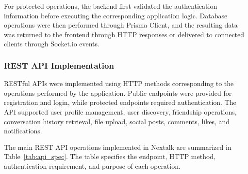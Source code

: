 \documentclass[12pt, a4paper]{article}
\begin{document}
For protected operations, the backend first validated the authentication information before executing the corresponding application logic. Database operations were then performed through Prisma Client, and the resulting data was returned to the frontend through HTTP responses or delivered to connected clients through Socket.io events.

\subsubsection{REST API Implementation}

RESTful APIs were implemented using HTTP methods corresponding to the operations performed by the application. Public endpoints were provided for registration and login, while protected endpoints required authentication. The API supported user profile management, user discovery, friendship operations, conversation history retrieval, file upload, social posts, comments, likes, and notifications.

The main REST API operations implemented in Nextalk are summarized in Table~\ref{tab:api_spec}. The table specifies the endpoint, HTTP method, authentication requirement, and purpose of each operation.
\end{document}
